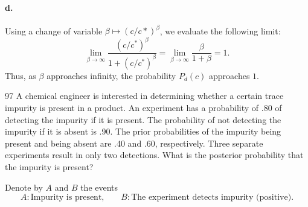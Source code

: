 \documentclass{exam}
\begin{document}
\paragraph{d.} Using a change of variable $\beta \mapsto (c/c*)^\beta$, we evaluate the following limit:
\[
	\lim_{\beta \to \infty} \frac{(c/c^*)^\beta}{1 + (c/c^*)^\beta} = \lim_{\beta \to \infty} \frac{\beta}{1 + \beta} = 1.
\]
Thus, as $\beta$ approaches infinity, the probability $P_d(c)$ approaches $1$.

\begin{problem}{97}
	A chemical engineer is interested in determining whether a certain trace impurity is present in a product. An experiment has a probability of .80 of detecting the impurity if it is present. The probability of not detecting the impurity if it is absent is .90. The prior probabilities of the impurity being present and being absent are .40 and .60, respectively. Three separate experiments result in only two detections. What is the posterior probability that the impurity is present?
\end{problem}

Denote by $A$ and $B$ the events
\[
	A: \text{Impurity is present,} \qquad B: \text{The experiment detects impurity (positive)}.
\]
\end{document}
